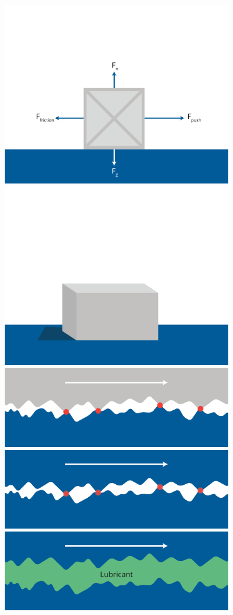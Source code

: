 \includegraphics[width=0.75\textwidth]{friction-01.png}
\includegraphics[width=0.75\textwidth]{friction-02.png}
\includegraphics[width=0.75\textwidth]{friction-03.png}
\includegraphics[width=0.75\textwidth]{friction-04.png}
\includegraphics[width=0.75\textwidth]{friction-05.png}
